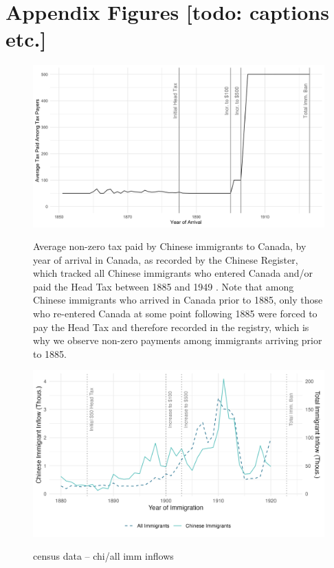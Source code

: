 
\appendix 
\section{Appendix Figures [todo: captions etc.]}

\begin{figure}
    \centering 
    \caption{Average non-zero tax paid by Chinese immigrants to Canada, by year of arrival in Canada, as recorded by the Chinese Register, which tracked all Chinese immigrants who entered Canada and/or paid the Head Tax between 1885 and 1949 \citep{chineseregister}. Note that among Chinese immigrants who arrived in Canada prior to 1885, only those who re-entered Canada at some point following 1885 were forced to pay the Head Tax and therefore recorded in the registry, which is why we observe non-zero payments among immigrants arriving prior to 1885.}
    \includegraphics[width=\textwidth]{../../figs/fig1_taxespaid.png}
    \label{fig:taxpaid}
\end{figure}


\begin{figure}
    \centering 
    \caption{census data -- chi/all imm inflows}
    \includegraphics[width=\textwidth]{../../figs/fig2_census_flow.png}
    \label{fig:immflowcensus}
\end{figure}


